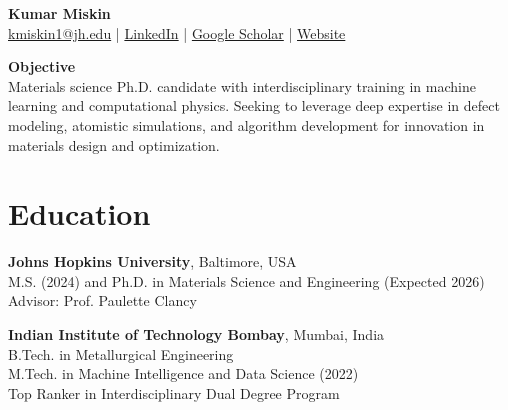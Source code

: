 \documentclass[10pt]{article}
\begin{document}
\begin{center}
    {\LARGE \textbf{Kumar Miskin}}\\[0.2em]
    \href{mailto:kmiskin1@jh.edu}{kmiskin1@jh.edu} \quad | \quad 
    \href{https://www.linkedin.com/in/kumar-miskin/}{LinkedIn} \quad | \quad
    \href{https://scholar.google.com/citations?hl=en&user=AWJb6VwAAAAJ}{Google Scholar} \quad | \quad
    \href{https://sites.google.com/view/kumarpmiskin/}{Website}
\end{center}

\vspace{0.5em}
\noindent
\textbf{\large Objective}\\
Materials science Ph.D. candidate with interdisciplinary training in machine learning and computational physics. Seeking to leverage deep expertise in defect modeling, atomistic simulations, and algorithm development for innovation in materials design and optimization.

\section*{Education}
\textbf{Johns Hopkins University}, Baltimore, USA \\
M.S. (2024) and Ph.D. in Materials Science and Engineering (Expected 2026) \\
Advisor: Prof. Paulette Clancy

\textbf{Indian Institute of Technology Bombay}, Mumbai, India \\
B.Tech. in Metallurgical Engineering \\
M.Tech. in Machine Intelligence and Data Science (2022) \\
Top Ranker in Interdisciplinary Dual Degree Program
\end{document}
